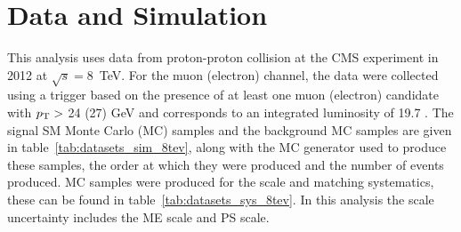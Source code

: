 


\section{Data and Simulation}
\label{sec:datasimulation}
This analysis uses data from proton-proton collision at the CMS experiment in 2012 at $\sqrt{s}=8$~TeV.
For the muon (electron) channel, the data were collected using a trigger based on the presence of at least one muon (electron) candidate with $p_{\mathrm{T}} > $ 24 (27) GeV and corresponds to an integrated luminosity of 19.7 \fbinv .
The signal SM \tttt Monte Carlo (MC) samples and the background MC samples are given in table~\ref{tab:datasets_sim_8tev}, along with the MC generator used to produce these samples, the order at which they were produced and the number of events produced. MC samples were produced for the scale and matching systematics, these can be found in table~\ref{tab:datasets_sys_8tev}. In this analysis the scale uncertainty includes the ME scale and PS scale.


